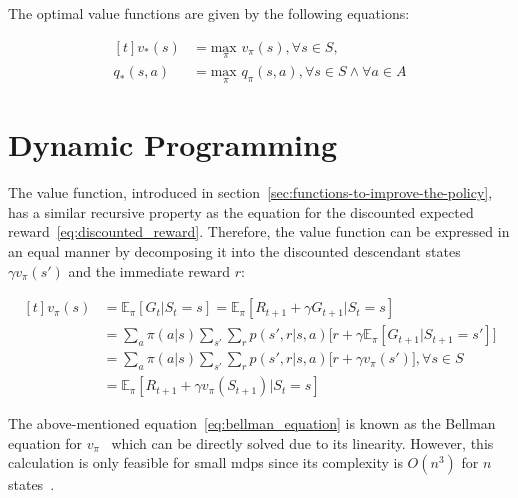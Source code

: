 \documentclass[draft,final]{vutinfth} %
\newcommand{\p}[1]{see p. #1}
\begin{document}
    The optimal value functions are given by the following equations:

    \begin{equation}
        \begin{aligned}[t]
            v_*(s) &= \underset{\pi}{\text{max }}v_\pi(s), \forall s \in \mathit{S}, \\
            q_*(s,a) &= \underset{\pi}{\text{max }}q_\pi(s,a), \forall s \in \mathit{S} \land \forall a \in \mathit{A}\label{eq:optimal}
        \end{aligned}
    \end{equation}


    \section{Dynamic Programming}

    The value function, introduced in section~\ref{sec:functions-to-improve-the-policy}, has a similar recursive property as the equation for the discounted expected reward~\eqref{eq:discounted_reward}.
    Therefore, the value function can be expressed in an equal manner by decomposing it into the discounted descendant states $\gamma v_\pi(s')$ and the immediate reward $r$:

    \begin{equation}
        \begin{aligned}[t]
            v_\pi(s) &= \mathbb{E}_\pi[G_t|S_t=s] = \mathbb{E}_\pi[R_{t+1} + \gamma G_{t+1}|S_t=s] \\
            &  =  \sum_{a} \pi(a|s) \sum_{s'}\sum_{r} p(s',r|s,a) \bigg[r + \gamma \mathbb{E}_\pi[G_{t+1}|S_{t+1} = s'] \bigg] \\
            &  =  \sum_{a} \pi(a|s) \sum_{s'}\sum_{r} p(s',r|s,a) \bigg[r + \gamma v_{\pi}(s') \bigg], \forall s \in \mathit{S} \\
            &  =  \mathbb{E}_\pi[R_{t+1} + \gamma v_\pi(S_{t+1})|S_t=s]
            \label{eq:bellman_equation}
        \end{aligned}
    \end{equation}

    The above-mentioned equation~\eqref{eq:bellman_equation} is known as the Bellman equation for $v_\pi$~\citep[\p{59}]{sutton_reinforcement_2018} which can be directly solved due to its linearity.
    However, this calculation is only feasible for small \glspl{mdp} since its complexity is $O(n^3)$ for $n$ states~.
\end{document}
